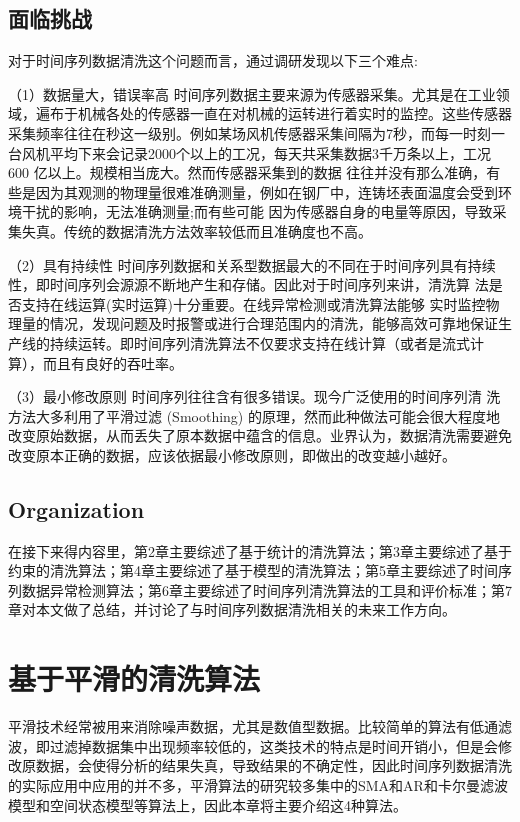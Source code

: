 \documentclass{article}
\begin{document}
\subsection{面临挑战 }
对于时间序列数据清洗这个问题而言，通过调研发现以下三个难点:
\par（1）数据量大，错误率高
时间序列数据主要来源为传感器采集。尤其是在工业领域，遍布于机械各处的传感器一直在对机械的运转进行着实时的监控。这些传感器采集频率往往在秒这一级别。例如某场风机传感器采集间隔为7秒，而每一时刻一台风机平均下来会记录2000个以上的工况，每天共采集数据3千万条以上，工况 600 亿以上。规模相当庞大。然而传感器采集到的数据 往往并没有那么准确，有些是因为其观测的物理量很难准确测量，例如在钢厂中，连铸坯表面温度会受到环境干扰的影响，无法准确测量;而有些可能 因为传感器自身的电量等原因，导致采集失真。传统的数据清洗方法效率较低而且准确度也不高。 
\par（2）具有持续性 
时间序列数据和关系型数据最大的不同在于时间序列具有持续性，即时间序列会源源不断地产生和存储。因此对于时间序列来讲，清洗算 法是否支持在线运算(实时运算)十分重要。在线异常检测或清洗算法能够 实时监控物理量的情况，发现问题及时报警或进行合理范围内的清洗，能够高效可靠地保证生产线的持续运转。即时间序列清洗算法不仅要求支持在线计算（或者是流式计算），而且有良好的吞吐率。 
\par（3）最小修改原则
时间序列往往含有很多错误。现今广泛使用的时间序列清 洗方法大多利用了平滑过滤 (Smoothing) 的原理，然而此种做法可能会很大程度地 改变原始数据，从而丢失了原本数据中蕴含的信息。业界认为，数据清洗需要避免改变原本正确的数据，应该依据最小修改原则，即做出的改变越小越好。

\subsection{Organization}
在接下来得内容里，第2章主要综述了基于统计的清洗算法；第3章主要综述了基于约束的清洗算法；第4章主要综述了基于模型的清洗算法；第5章主要综述了时间序列数据异常检测算法；第6章主要综述了时间序列清洗算法的工具和评价标准；第7章对本文做了总结，并讨论了与时间序列数据清洗相关的未来工作方向。



\section{基于平滑的清洗算法}
平滑技术经常被用来消除噪声数据，尤其是数值型数据。比较简单的算法有低通滤波，即过滤掉数据集中出现频率较低的，这类技术的特点是时间开销小，但是会修改原数据，会使得分析的结果失真，导致结果的不确定性，因此时间序列数据清洗的实际应用中应用的并不多，平滑算法的研究较多集中的SMA和AR和卡尔曼滤波模型和空间状态模型等算法上，因此本章将主要介绍这4种算法。
\end{document}
